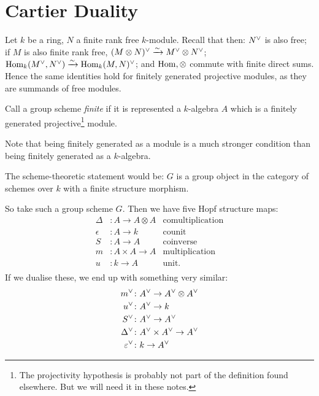 \documentclass{memoir}
\begin{document}
\section{Cartier Duality}\label{sec:Cartier_duality}
Let $ k $ be a ring, $ N $ a finite rank free $ k $-module. Recall that then: $ N{}^\vee $ is also free; if $ M $ is also finite rank free, $(M\otimes N){}^\vee\xrightarrow{\sim} M{}^\vee\otimes N{}^\vee  $; $ \operatorname{Hom}_k(M{}^\vee, N{}^\vee)\xrightarrow{\sim} \operatorname{Hom}_k(M,N){}^\vee $; and $ \operatorname{Hom}, \otimes $ commute with finite direct sums.
Hence the same identities hold for finitely generated projective modules, as they are summands of free modules.

\begin{definition}\label{def:finite_group_scheme}
	Call a group scheme \emph{finite} if it is represented a $ k $-algebra $ A $ which is a finitely generated projective\footnote{The projectivity hypothesis is probably not part of the definition found elsewhere. But we will need it in these notes.} module. 
\end{definition} Note that being finitely generated as a module is a much stronger condition than being finitely generated as a $ k $-algebra.
\begin{remark}
	The scheme-theoretic statement would be: $ G $ is a group object in the category of schemes over $ k $ with a finite structure morphism.
\end{remark}
So take such a group scheme $ G $. Then we have five Hopf structure maps:
\begin{align*}
	\Delta &\colon A\to A\otimes A &\textrm{comultiplication}\\
	\epsilon&\colon A\to k &\textrm{counit}\\
	S&\colon A\to A& \textrm{coinverse}\\
	m&\colon A\times A\to A &\textrm{multiplication}\\
	u&\colon k\to A& \textrm{unit}.\\
\end{align*}
If we dualise these, we end up with something very similar:
\begin{align*}
	m{}^\vee  &\colon A{}^\vee\to A{}^\vee\otimes A{}^\vee \\
	u{}^\vee&\colon A{}^\vee\to k \\
	S{}^\vee&\colon A{}^\vee\to A{}^\vee\\
	\Delta{}^\vee&\colon A{}^\vee\times A{}^\vee\to A{}^\vee \\
	\varepsilon{}^\vee&\colon k\to A{}^\vee\\
\end{align*}
\end{document}
